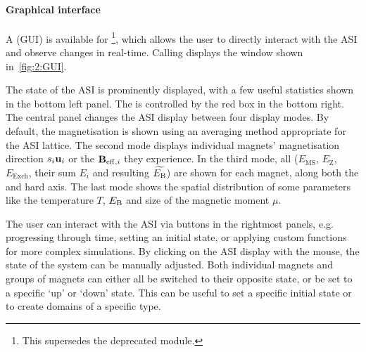 \paragraph{Graphical interface}
A  (GUI) is available for \hotspice\footnote{
	This supersedes the deprecated  module.
}, which allows the user to directly interact with the ASI and observe changes in real-time.
Calling  displays the window shown in~\cref{fig:2:GUI}.


The state of the ASI is prominently displayed, with a few useful statistics shown in the bottom left panel.
The  is controlled by the red box in the bottom right.
The central panel changes the ASI display between four display modes.
By default, the magnetisation is shown using an averaging method appropriate for the ASI lattice.
The second mode displays individual magnets' magnetisation direction $s_i \boldsymbol{\mathbf{u}}_i$ or the  $\boldsymbol{\mathbf{B}}_{\mathrm{eff},i}$ they experience.
In the third mode, all  ($E_\mathrm{MS}$, $E_\mathrm{Z}$, $E_\mathrm{Exch}$, their sum $E_i$ and resulting $\widetilde{E_\mathrm{B}}$) are shown for each magnet, along both the  and hard axis.
The last mode shows the spatial distribution of some parameters like the temperature $T$,  $E_\mathrm{B}$ and size of the magnetic moment $\mu$. \par
The user can interact with the ASI via buttons in the rightmost panels, e.g. progressing through time, setting an initial state, or applying custom functions for more complex simulations.
By clicking on the ASI display with the mouse, the state of the system can be manually adjusted.
Both individual magnets and groups of magnets can either all be switched to their opposite state, or be set to a specific `up' or `down' state.
This can be useful to set a specific initial state or to create domains of a specific type.


